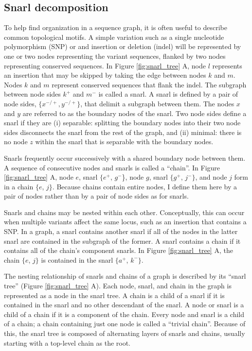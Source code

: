 \documentclass[11pt]{ucscthesis}
\begin{document}
\subsection{Snarl decomposition}

To help find organization in a sequence graph, it is often useful to describe common topological motifs.
A simple variation such as a single nucleotide polymorphism (SNP) or and insertion or deletion (indel) will be represented by one or two nodes representing the variant sequences, flanked by two nodes representing conserved sequences.
In Figure \ref{fig:snarl_tree} A, node $l$ represents an insertion that may be skipped by taking the edge between nodes $k$ and $m$.
Nodes $k$ and $m$ represent conserved sequences that flank the indel.
The subgraph between node sides $k^+$ and $m^-$ is called a snarl.
A snarl is defined by a pair of node sides, $\{x^{-/+}, y^{-/+}\}$, that delimit a subgraph between them.
The nodes $x$ and $y$ are referred to as the boundary nodes of the snarl.
Two node sides define a snarl if they are (i) separable: splitting the boundary nodes into their two node sides disconnects the snarl from the rest of the graph, and (ii) minimal: there is no node $z$ within the snarl that is separable with the boundary nodes.

Snarls frequently occur successively with a shared boundary node between them.
A sequence of consecutive nodes and snarls is called a ``chain''.
In Figure \ref{fig:snarl_tree} A, node $e$, snarl $\{e^+$, $g^-$\}, node $g$, snarl $\{g^+$, $j^-\}$, and node $j$ form in a chain $\{e$, $j\}$.
Because chains contain entire nodes, I define them here by a pair of nodes rather than by a pair of node sides as for snarls.

Snarls and chains may be nested within each other.
Conceptually, this can occur when multiple variants affect the same locus, such as an insertion that contains a SNP.
In a graph, a snarl contains another snarl if all of the nodes in the latter snarl are contained in the subgraph of the former.
A snarl contains a chain if it contains all of the chain's component snarls.
In Figure \ref{fig:snarl_tree} A, the chain $\{e$, $j\}$ is contained in the snarl $\{a^+$, $k^-\}$.

The nesting relationship of snarls and chains of a graph is described by its ``snarl tree'' (Figure \ref{fig:snarl_tree} A).
Each node, snarl, and chain in the graph is represented as a node in the snarl tree.
A chain is a child of a snarl if it is contained in the snarl and no other descendant of the snarl.
A node or snarl is a child of a chain if it is a component of the chain.
Every node and snarl is a child of a chain; a chain containing just one node is called a ``trivial chain''.
Because of this, the snarl tree is composed of alternating layers of snarls and chains, usually starting with a top-level chain as the root.
\end{document}
